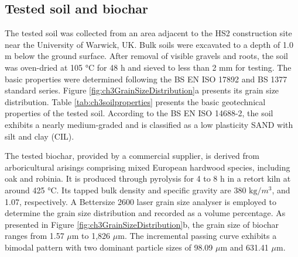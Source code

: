 \subsection{Tested soil and biochar}
The tested soil was collected from an area adjacent to the HS2 construction site near the University of Warwick, UK. Bulk soils were excavated to a depth of 1.0 m below the ground surface. After removal of visible gravels and roots, the soil was oven-dried at 105 °C for 48 h and sieved to less than 2 mm for testing. The basic properties were determined following the BS EN ISO 17892 and BS 1377 standard series. Figure \ref{fig:ch3GrainSizeDistribution}a presents its grain size distribution. Table \ref{tab:ch3soilproperties} presents the basic geotechnical properties of the tested soil. According to the BS EN ISO 14688-2, the soil exhibits a nearly medium-graded and is classified as a low plasticity SAND with silt and clay (CIL).\par
The tested biochar, provided by a commercial supplier, is derived from arboricultural arisings comprising mixed European hardwood species, including oak and robinia. It is produced through pyrolysis for 4 to 8 h in a retort kiln at around 425 °C. Its tapped bulk density and specific gravity are 380 $\mathrm{kg}/m^{3}$, and 1.07, respectively. A Bettersize 2600 laser grain size analyser is employed to determine the grain size distribution and recorded as a volume percentage. As presented in Figure \ref{fig:ch3GrainSizeDistribution}b, the grain size of biochar ranges from 1.57 $\mu$m to 1,826 $\mu$m. The incremental passing curve exhibits a bimodal pattern with two dominant particle sizes of 98.09 $\mu$m and 631.41 $\mu$m.\par

